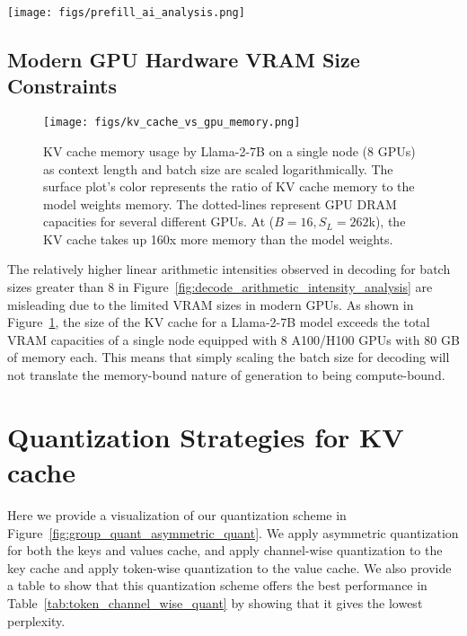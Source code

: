 \begin{figure*}[h]
    \centering
    \texttt{[image: figs/prefill\_ai\_analysis.png]}
    \caption{During prefill, all regimes lie above the ridge plane and thus are compute-bound. }
    \label{fig:prefill_arithmetic_intensity_analysis}
\end{figure*}

\subsection{Modern GPU Hardware VRAM Size Constraints}
\label{appendix:gpu_memory_constraints}
\begin{figure}[H]
    \centering
    \texttt{[image: figs/kv\_cache\_vs\_gpu\_memory.png]}
    \caption{KV cache memory usage by Llama-2-7B on a single node (8 GPUs) as context length and batch size are scaled logarithmically. The surface plot's color represents the ratio of KV cache memory to the model weights memory. The dotted-lines represent GPU DRAM capacities for several different GPUs. At ($B=16, S_L=262$k), the KV cache takes up 160x more memory than the model weights.}
    \label{fig:kv_cache_vs_gpu_memory}
\end{figure}
The relatively higher linear arithmetic intensities observed in decoding for batch sizes greater than 8 in Figure~\ref{fig:decode_arithmetic_intensity_analysis} are misleading due to the limited VRAM sizes in modern GPUs. As shown in Figure~\ref{fig:kv_cache_vs_gpu_memory}, the size of the KV cache for a Llama-2-7B model exceeds the total VRAM capacities of a single node equipped with 8 A100/H100 GPUs with 80 GB of memory each. This means that simply scaling the batch size for decoding will not translate the memory-bound nature of generation to being compute-bound.

\section{Quantization Strategies for KV cache}
\label{appendix:quantization_strategies}
Here we provide a visualization of our quantization scheme in Figure~\ref{fig:group_quant_asymmetric_quant}. We apply asymmetric quantization for both the keys and values cache, and apply channel-wise quantization to the key cache and apply token-wise quantization to the value cache. We also provide a table to show that this quantization scheme offers the best performance in Table~\ref{tab:token_channel_wise_quant} by showing that it gives the lowest perplexity.

